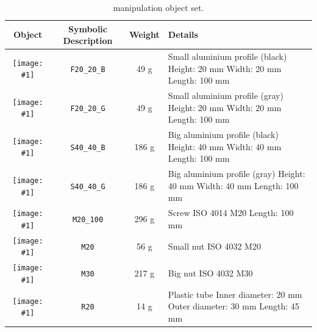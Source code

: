 \newcommand{\imageView}[1]{\texttt{[image: \#1]}}
{
\newcommand{\rowpadding}{0.4cm}
\setlength\extrarowheight{\rowpadding}
\begin{table}[p]
\begin{tabular}{|c|c|c|m{6cm}|}
\hline
Object & Symbolic Description & Weight & Details \\
\hline
\imageView{./images/F20_20_B.jpg} & \texttt{F20\_20\_B} & 49 g & Small aluminium profile (black)\newline
 Height: 20 mm \newline
 Width: 20 mm \newline
 Length: 100 mm \\ [\rowpadding]
\hline
\imageView{./images/F20_20_G.jpg} & \texttt{F20\_20\_G} & 49 g & Small aluminium profile (gray)\newline
 Height: 20 mm \newline
 Width: 20 mm \newline
 Length: 100 mm \\ [\rowpadding]
\hline
\imageView{./images/S40_40_B.jpg} & \texttt{S40\_40\_B} & 186 g & Big aluminium profile (black)\newline
 Height: 40 mm \newline
 Width: 40 mm \newline
 Length: 100 mm \\ [\rowpadding]
\hline
\imageView{./images/S40_40_G.jpg} & \texttt{S40\_40\_G} & 186 g & Big aluminium profile (gray)\newline
 Height: 40 mm \newline
 Width: 40 mm \newline
 Length: 100 mm \\ [\rowpadding]
\hline
\imageView{./images/M20_100.jpg} & \texttt{M20\_100} & 296 g & Screw\newline
 ISO 4014 \newline
 M20 \newline
 Length: 100 mm \\ [\rowpadding]
\hline
\imageView{./images/M20.jpg} & \texttt{M20} & 56 g & Small nut\newline
 ISO 4032 \newline 
 M20 \\ [\rowpadding]
\hline
\imageView{./images/M30.jpg} & \texttt{M30} & 217 g & Big nut\newline
 ISO 4032 \newline 
 M30 \\ [\rowpadding]
\hline
\imageView{./images/R20.jpg} & \texttt{R20} & 14 g & Plastic tube\newline
 Inner diameter: 20 mm \newline
 Outer diameter: 30 mm \newline
 Length: 45 mm \\ [\rowpadding]
\hline
\end{tabular}
\caption{\RCAW manipulation object set.}
\label{tab:manipulation_objects}
\end{table}


}
